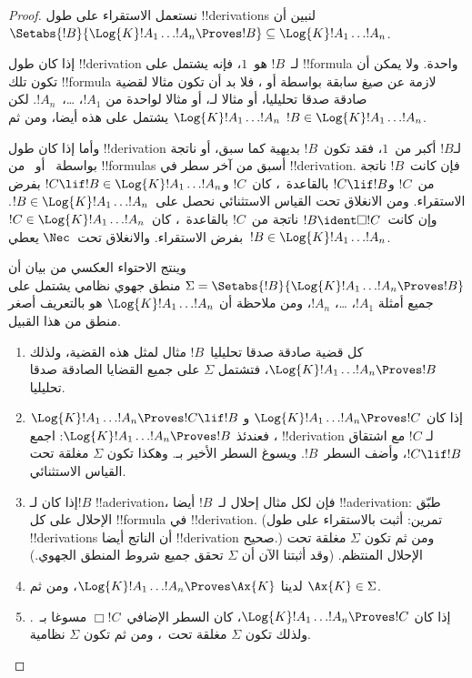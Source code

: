 \documentclass[../../../include/open-logic-section]{subfiles}
\begin{document}
\begin{proof}
  نستعمل الاستقراء على طول !!{derivation}s لنبين أن
  $\Setabs{!B}{\Log{K} !A_1 \dots !A_n \Proves !B} \subseteq
  \Log{K} !A_1 \dots !A_n$.

  إذا كان طول !!{derivation} لـ~$!B$ هو~$1$، فإنه يشتمل على
  !!{formula} واحدة. ولا يمكن أن تكون تلك !!{formula} لازمة عن صيغ
  سابقة بواسطة \MP{} أو \Nec، فلا بد أن تكون مثالا لقضية صادقة صدقا
  تحليليا، أو مثالا لـ، أو مثالا
  لواحدة من $!A_1$، \dots،~$!A_n$. لكن $\Log{K}!A_1\dots!A_n$ يشتمل
  على هذه أيضا، ومن ثم $!B \in \Log{K}!A_1 \dots !A_n$.

  وأما إذا كان طول !!{derivation} لـ$!B$ أكبر من~$1$،
  فقد تكون~$!B$ بديهية كما سبق، أو ناتجة بواسطة~\MP{} أو~\Nec{}
  من !!{formula}s أسبق من آخر سطر في !!{derivation}.
  فإن كانت~$!B$ ناتجة من~$!C$ و$!C \lif !B$ بالقاعدة~\MP،
  كان~$!C$ و$!C \lif !B \in
  \Log{K}!A_1 \dots !A_n$ بفرض الاستقراء. ومن الانغلاق تحت
  القياس الاستثنائي نحصل على~$!B \in \Log{K}!A_1 \dots !A_n$.
  وإن كانت~$!B \ident \Box !C$ ناتجة من~$!C$ بالقاعدة~\Nec،
  كان~$!C
  \in \Log{K}!A_1 \dots !A_n$ بفرض الاستقراء. والانغلاق
  تحت~$\Nec$ يعطي~$!B \in
  \Log{K}!A_1\dots!A_n$.

  وينتج الاحتواء العكسي من بيان أن
  $\Sigma = \Setabs{!B}{\Log{K} !A_1 \dots !A_n \Proves !B }$ منطق جهوي
  نظامي يشتمل على جميع أمثلة $!A_1$، \dots، $!A_n$، ومن ملاحظة أن
  $\Log{K} !A_1 \dots !A_n$ هو بالتعريف أصغر منطق من هذا القبيل.
  \begin{enumerate}
    \item كل قضية صادقة صدقا تحليليا~$!B$ مثال لمثل هذه القضية، ولذلك
      $\Log{K}!A_1\dots!A_n \Proves !B$، فتشتمل $\Sigma$ على جميع
      القضايا الصادقة صدقا تحليليا.
    \item إذا كان $\Log{K}!A_1\dots!A_n \Proves !C$ و
      $\Log{K}!A_1\dots!A_n \Proves !C \lif !B$، فعندئذ
      $\Log{K}!A_1\dots!A_n \Proves !B$: اجمع !!{derivation} لـ
      $!C$ مع اشتقاق $!C \lif !B$، وأضف السطر~$!B$. ويسوغ السطر
      الأخير بـ\MP{}. وهكذا تكون $\Sigma$ مغلقة تحت القياس الاستثنائي.
    \item إذا كان لـ$!B$ !!a{derivation}، فإن لكل مثال إحلال لـ~$!B$
      أيضا !!a{derivation}: طبّق الإحلال على كل !!{formula} في
      !!{derivation}. (تمرين: أثبت بالاستقراء على طول !!{derivation}s
      أن الناتج أيضا !!{derivation} صحيح.) ومن ثم تكون $\Sigma$
      مغلقة تحت الإحلال المنتظم. (وقد أثبتنا الآن أن $\Sigma$ تحقق
      جميع شروط المنطق الجهوي.)
    \item لدينا $\Log{K}!A_1\dots!A_n \Proves \Ax{K}$، ومن ثم
      $\Ax{K} \in \Sigma$.
    \item إذا كان $\Log{K}!A_1\dots!A_n \Proves !C$، كان السطر
      الإضافي~$\Box !C$ مسوغا بـ~\Nec. ولذلك تكون $\Sigma$ مغلقة
      تحت~\Nec، ومن ثم تكون $\Sigma$ نظامية.
  \end{enumerate}
\end{proof}
\end{document}
